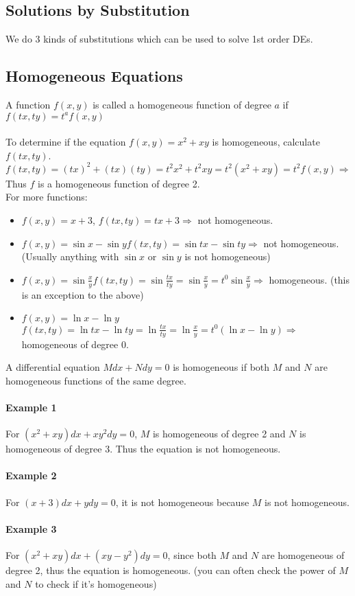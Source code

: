 \documentclass{article}
\begin{document}
\subsection{Solutions by Substitution}
We do 3 kinds of substitutions which can be used to solve 1st order DEs.
\subsection{Homogeneous Equations}
A function $f(x,y)$ is called a homogeneous function of degree $a$ if $f(tx,ty)=t^af(x,y)$
\\\\To determine if the equation $f(x,y)=x^2+xy$ is homogeneous, calculate $f(tx,ty)$.
\\$f(tx,ty)=(tx)^2+(tx)(ty)=t^2x^2+t^2xy=t^2(x^2+xy)=t^2f(x,y)\Rightarrow$ Thus $f$ is a homogeneous function of degree 2.
\\For more functions: \begin{itemize}
    \itemsep 0em
    \item $f(x,y)=x+3$, $f(tx,ty)=tx+3\Rightarrow$ not homogeneous.
    \item $f(x,y)=\sin{x}-\sin{y}$\quad$f(tx,ty)=\sin{tx}-\sin{ty}\Rightarrow$ not homogeneous. (Usually anything with $\sin{x}$ or $\sin{y}$ is not homogeneous)
    \item $f(x,y)=\sin{\frac{x}{y}}$\quad$f(tx,ty)=\sin{\frac{tx}{ty}}=\sin{\frac{x}{y}}=t^0\sin\frac{x}{y}\Rightarrow$ homogeneous. (this is an exception to the above)
    \item $f(x,y)=\ln{x}-\ln{y}$\quad$f(tx,ty)=\ln{tx}-\ln{ty}=\ln{\frac{tx}{ty}}=\ln{\frac{x}{y}}=t^0(\ln{x}-\ln{y})\Rightarrow$ homogeneous of degree 0.
\end{itemize}
A differential equation $Mdx+Ndy=0$ is homogeneous if both $M$ and $N$ are homogeneous functions of the same degree.
\paragraph{Example 1} For $(x^2+xy)dx+xy^2dy=0$, $M$ is homogeneous of degree 2 and $N$ is homogeneous of degree 3. Thus the equation is not homogeneous.
\paragraph{Example 2} For $(x+3)dx+ydy=0$, it is not homogeneous because $M$ is not homogeneous.
\paragraph{Example 3} For $(x^2+xy)dx+(xy-y^2)dy=0$, since both $M$ and $N$ are homogeneous of degree 2, thus the equation is homogeneous. (you can often check the power of $M$ and $N$ to check if it's homogeneous)
\end{document}
